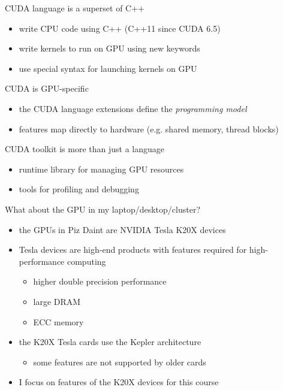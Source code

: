 \begin{frame}[fragile]{}
    \begin{info}{CUDA language is a superset of C++}
        \begin{itemize}
            \item write CPU code using C++ (C++11 since CUDA 6.5)
            \item write kernels to run on GPU using new keywords
            \item use special syntax for launching kernels on GPU
        \end{itemize}
    \end{info}

    \begin{info}{CUDA is GPU-specific}
        \begin{itemize}
            \item the CUDA language extensions define the \emph{programming model}
            \item features map directly to hardware (e.g. shared memory, thread blocks)
        \end{itemize}
    \end{info}

    \begin{info}{CUDA toolkit is more than just a language}
        \begin{itemize}
            \item runtime library for managing GPU resources
            \item tools for profiling and debugging
        \end{itemize}
    \end{info}
\end{frame}


\begin{frame}[fragile]{}
    \begin{info}{What about the GPU in my laptop/desktop/cluster?}
        \begin{itemize}
            \item the GPUs in Piz Daint are NVIDIA Tesla K20X devices
            \item Tesla devices are high-end products with features required for high-performance computing
            \begin{itemize}
                \item higher double precision performance
                \item large DRAM
                \item ECC memory
            \end{itemize}
            \item the K20X Tesla cards use the Kepler architecture
            \begin{itemize}
                \item some features are not supported by older cards
            \end{itemize}
            \item I focus on features of the K20X devices for this course
        \end{itemize}
    \end{info}

\end{frame}
